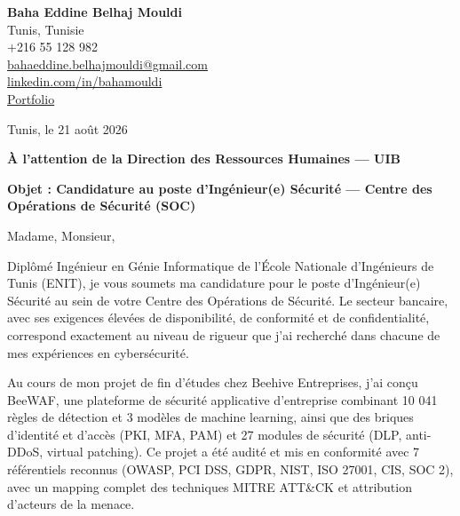\documentclass[a4paper,11pt]{article}
\begin{document}
\begin{flushright}
{\bfseries Baha Eddine Belhaj Mouldi}\\
Tunis, Tunisie\\
+216 55 128 982\\
\href{mailto:bahaeddine.belhajmouldi@gmail.com}{bahaeddine.belhajmouldi@gmail.com}\\
\href{https://linkedin.com/in/bahamouldi}{linkedin.com/in/bahamouldi}\\
\href{https://bahamouldi.github.io/portfolio/}{Portfolio}
\end{flushright}

\vspace{0.8cm}

\begin{flushleft}
Tunis, le 21 août 2026

\vspace{0.8cm}

{\bfseries À l'attention de la Direction des Ressources Humaines --- UIB}

\vspace{0.6cm}

{\bfseries Objet : Candidature au poste d'Ingénieur(e) Sécurité --- Centre des Opérations de Sécurité (SOC)}
\end{flushleft}

\vspace{0.6cm}

Madame, Monsieur,

\vspace{0.4cm}

Diplômé Ingénieur en Génie Informatique de l'École Nationale d'Ingénieurs de Tunis (ENIT), je vous soumets ma candidature pour le poste d'Ingénieur(e) Sécurité au sein de votre Centre des Opérations de Sécurité. Le secteur bancaire, avec ses exigences élevées de disponibilité, de conformité et de confidentialité, correspond exactement au niveau de rigueur que j'ai recherché dans chacune de mes expériences en cybersécurité.

Au cours de mon projet de fin d'études chez Beehive Entreprises, j'ai conçu BeeWAF, une plateforme de sécurité applicative d'entreprise combinant 10 041 règles de détection et 3 modèles de machine learning, ainsi que des briques d'identité et d'accès (PKI, MFA, PAM) et 27 modules de sécurité (DLP, anti-DDoS, virtual patching). Ce projet a été audité et mis en conformité avec 7 référentiels reconnus (OWASP, PCI DSS, GDPR, NIST, ISO 27001, CIS, SOC 2), avec un mapping complet des techniques MITRE ATT\&CK et attribution d'acteurs de la menace.
\end{document}
